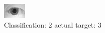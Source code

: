\begin{figure}[h!]
\begin{center}
\includegraphics[width=0.60\columnwidth]{figures/ID1097_class_2_target_3.png}
\end{center}
\caption{ Classification: 2 actual target: 3}
\label{fig:ID1097_class_2_target_3}
\end{figure}
